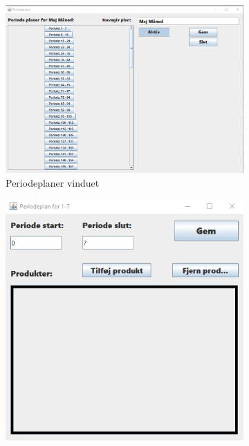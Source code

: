 \begin{figure}
    \centering
    \begin{subfigure}[b]{0.475\textwidth}
        \centering
        \includegraphics[width=\textwidth]{figures/implementation/UI/periodeplaner.png}
        \caption{Periodeplaner vinduet}
        \label{fig:periodeplaner}
    \end{subfigure}
    \hfill
    \begin{subfigure}[b]{0.475\textwidth}
        \centering 
        \includegraphics[width=\textwidth]{figures/implementation/UI/periodeplan.png}

\end{subfigure}
\end{figure}
